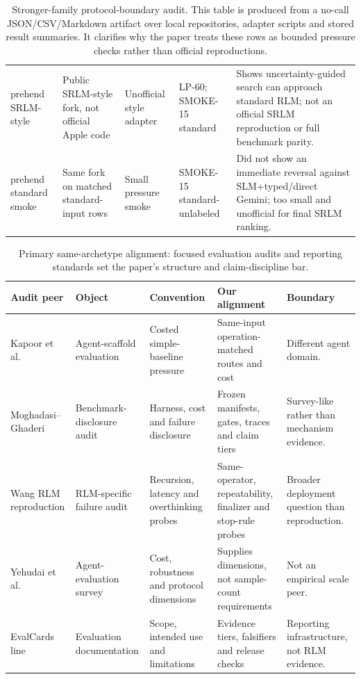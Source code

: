 \documentclass[letterpaper]{article}
\begin{document}
\begin{table}[!t]
\begin{tabular}{@{}p{2.3cm}p{3.3cm}p{2.8cm}p{2.2cm}p{4.0cm}@{}}
prehend SRLM-style & Public SRLM-style fork, not official Apple code & Unofficial style adapter & LP-60; SMOKE-15 standard & Shows uncertainty-guided search can approach standard RLM; not an official SRLM reproduction or full benchmark parity. \\
prehend standard smoke & Same fork on matched standard-input rows & Small pressure smoke & SMOKE-15 standard-unlabeled & Did not show an immediate reversal against SLM+typed/direct Gemini; too small and unofficial for final SRLM ranking. \\
\bottomrule
\end{tabular}
\caption{Stronger-family protocol-boundary audit. This table is produced from a no-call JSON/CSV/Markdown artifact over local repositories, adapter scripts and stored result summaries. It clarifies why the paper treats these rows as bounded pressure checks rather than official reproductions.}
\label{tab:supp-stronger-protocol-boundary}
\end{table}

\begin{table}[!t]
\centering
\small
\setlength{\tabcolsep}{2.5pt}
\begin{tabular}{@{}p{2.5cm}p{3.0cm}p{3.2cm}p{4.0cm}p{3.2cm}@{}}
\toprule
\textbf{Audit peer} & \textbf{Object} & \textbf{Convention} & \textbf{Our alignment} & \textbf{Boundary} \\
\midrule
Kapoor et al. & Agent-scaffold evaluation & Costed simple-baseline pressure & Same-input operation-matched routes and cost & Different agent domain. \\
Moghadasi--Ghaderi & Benchmark-disclosure audit & Harness, cost and failure disclosure & Frozen manifests, gates, traces and claim tiers & Survey-like rather than mechanism evidence. \\
Wang RLM reproduction & RLM-specific failure audit & Recursion, latency and overthinking probes & Same-operator, repeatability, finalizer and stop-rule probes & Broader deployment question than reproduction. \\
Yehudai et al. & Agent-evaluation survey & Cost, robustness and protocol dimensions & Supplies dimensions, not sample-count requirements & Not an empirical scale peer. \\
EvalCards line & Evaluation documentation & Scope, intended use and limitations & Evidence tiers, falsifiers and release checks & Reporting infrastructure, not RLM evidence. \\
\bottomrule
\end{tabular}
\caption{Primary same-archetype alignment: focused evaluation audits and reporting standards set the paper's structure and claim-discipline bar.}
\label{tab:supp-comparator-alignment}
\end{table}
\end{document}
